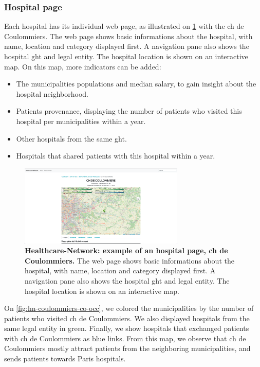 \subsubsection{Hospital page}

Each hospital has its individual web page, as illustrated on \cref{fig:hn-coulommiers-page} with the \ac{ch} de Coulommiers. The web page shows basic informations about the hospital, with name, location and category displayed first. A navigation pane also shows the hospital \ac{ght} and legal entity. The hospital location is shown on an interactive map. On this map, more indicators can be added:

\begin{itemize}
    \item The municipalities populations and median salary, to gain insight about the hospital neighborhood.
    \item Patients provenance, displaying the number of patients who visited this hospital per municipalities within a year.
    \item Other hospitals from the same \ac{ght}.
    \item Hospitals that shared patients with this hospital within a year.
\end{itemize}

\begin{figure}[H]
    \includegraphics[width=0.7\textwidth]{images/healthcare-network/hospital-page.png}
    \centering
    \caption{
        \textbf{Healthcare-Network: example of an hospital page, \acf{ch} de Coulommiers.} The web page shows basic informations about the hospital, with name, location and category displayed first. A navigation pane also shows the hospital \ac{ght} and legal entity. The hospital location is shown on an interactive map.
    }
    \label{fig:hn-coulommiers-page}
\end{figure}

On \cref{fig:hn-coulommiers-co-occ}, we colored the municipalities by the number of patients who visited \ac{ch} de Coulommiers. We also displayed hospitals from the same legal entity in green. Finally, we show hospitals that exchanged patients with \ac{ch} de Coulommiers as blue links. From this map, we observe that \ac{ch} de Coulommiers mostly attract patients from the neighboring municipalities, and sends patients towards Paris hospitals.

